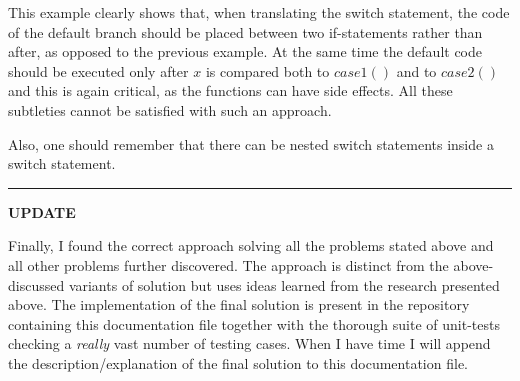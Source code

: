 \documentclass[a4paper]{article}
\begin{document}
This example clearly shows that, when translating the switch statement, the code of the default branch should be placed between two if-statements rather than after, as opposed to the previous example. At the same time the default code should be executed only after $x$ is compared both to $case1()$ and to $case2()$ and this is again critical, as the functions can have side effects. All these subtleties cannot be satisfied with such an approach.

Also, one should remember that there can be nested switch statements inside a switch statement.

\par\noindent\rule{\textwidth}{0.4pt}

\textbf{UPDATE}

Finally, I found the correct approach solving all the problems stated above and all other problems further discovered. The approach is distinct from the above-discussed variants of solution but uses ideas learned from the research presented above. The implementation of the final solution is present in the repository containing this documentation file together with the thorough suite of unit-tests checking a \emph{really} vast number of testing cases. When I have time I will append the description/explanation of the final solution to this documentation file. 
\end{document}
